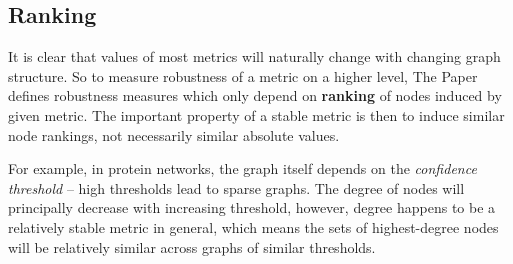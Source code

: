 
\subsection{Ranking}\label{sec:ranking}

It is clear that values of most metrics will naturally change with changing graph structure.
So to measure robustness of a metric on a higher level, The Paper defines robustness measures which only depend on \textbf{ranking} of nodes induced by given metric.
The important property of a stable metric is then to induce similar node rankings, not necessarily similar absolute values.

For example, in protein networks, the graph itself depends on the \textsl{confidence threshold} -- high thresholds lead to sparse graphs.
The degree of nodes will principally decrease with increasing threshold, however, degree happens to be a relatively stable metric in general, which means the sets of highest-degree nodes will be relatively similar across graphs of similar thresholds.

